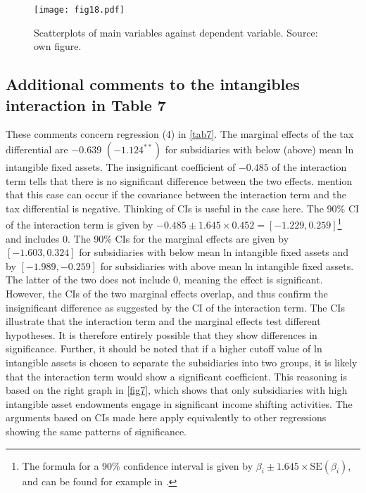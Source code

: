 \documentclass[10pt,twocolumn,oneside,cmyk]{article}
\begin{document}
\begin{figure*}[t]
 \centering \captionsetup{width=0.95\textwidth}
   \texttt{[image: fig18.pdf]}
 \caption[Scatterplots of main variables against dependent variable]{Scatterplots of main variables against dependent variable. Source: own figure.} \label{fig18}
\end{figure*}

\subsection{Additional comments to the intangibles interaction in Table 7}\label{app:D2}
These comments concern regression (4) in \cref{tab7}. The marginal effects of the tax differential are $-0.639$ $(-1.124^{**})$ for subsidiaries with below (above) mean ln intangible fixed assets. The insignificant coefficient of $-0.485$ of the interaction term tells that there is no significant difference between the two effects. \textcite[70]{brambor_understanding_2006} mention that this case can occur if the covariance between the interaction term and the tax differential is negative. Thinking of CIs is useful in the case here. The 90\% CI of the interaction term is given by $-0.485\pm1.645\times0.452=[-1.229 , 0.259]$\footnote{The formula for a 90\% confidence interval is given by $\beta_i \pm 1.645\times \text{SE}(\beta_i)$, and can be found for example in \textcite[138]{wooldridge_introductory_2009}.} and includes 0. The 90\% CIs for the marginal effects are given by $[-1.603 ,0.324]$ for subsidiaries with below mean ln intangible fixed assets and by $[-1.989 ,-0.259]$ for subsidiaries with above mean ln intangible fixed assets. The latter of the two does not include 0, meaning the effect is significant. However, the CIs of the two marginal effects overlap, and thus confirm the insignificant difference as suggested by the CI of the interaction term. The CIs illustrate that the interaction term and the marginal effects test different hypotheses. It is therefore entirely possible that they show differences in significance. Further, it should be noted that if a higher cutoff value of ln intangible assets is chosen to separate the subsidiaries into two groups, it is likely that the interaction term would show a significant coefficient. This reasoning is based on the right graph in \cref{fig7}, which shows that only subsidiaries with high intangible asset endowments engage in significant income shifting activities. The arguments based on CIs made here apply equivalently to other regressions showing the same patterns of significance.
\end{document}
